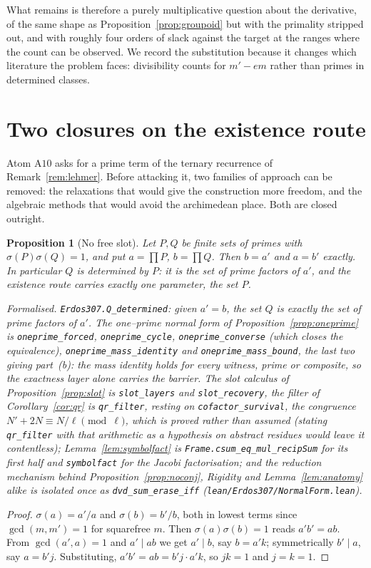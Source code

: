 \documentclass[11pt]{article}
\newtheorem{proposition}[theorem]{Proposition}
\theoremstyle{definition}
\begin{document}
What remains is therefore a purely multiplicative question about the derivative, of the same shape
as Proposition~\ref{prop:groupoid} but with the primality stripped out, and with roughly four orders
of slack against the target at the ranges where the count can be observed. We record the
substitution because it changes which literature the problem faces: divisibility counts for
$m'-em$ rather than primes in determined classes.


\section{Two closures on the existence route}\label{sec:exclosure}

Atom $\mathrm{A}10$ asks for a prime term of the ternary recurrence of
Remark~\textup{\ref{rem:lehmer}}. Before attacking it, two families of approach can be removed:
the relaxations that would give the construction more freedom, and the algebraic methods that
would avoid the archimedean place. Both are closed outright.

\begin{proposition}[No free slot]\label{prop:nofreeslot}
Let $P,Q$ be finite sets of primes with $\sigma(P)\sigma(Q)=1$, and put $a=\prod P$, $b=\prod Q$.
Then $b=a'$ and $a=b'$ exactly. In particular $Q$ is \emph{determined} by $P$: it is the set of
prime factors of $a'$, and the existence route carries exactly one parameter, the set $P$.

\textup{Formalised.} \texttt{Erdos307.Q\_determined}: given $a'=b$, the set $Q$ is exactly the set of
prime factors of $a'$. The one--prime normal form of Proposition~\ref{prop:oneprime} is
\texttt{oneprime\_forced}, \texttt{oneprime\_cycle}, \texttt{oneprime\_converse}
\textup{(}which closes the equivalence\textup{)},
\texttt{oneprime\_mass\_identity} and \texttt{oneprime\_mass\_bound}, the last two giving
part~\textup{(b)}: the mass identity holds for
\emph{every} witness, prime or composite, so the exactness layer alone carries the barrier. The slot
calculus of Proposition~\ref{prop:slot} is \texttt{slot\_layers} and \texttt{slot\_recovery}, the
filter of Corollary~\ref{cor:qr} is \texttt{qr\_filter}, resting on \texttt{cofactor\_survival},
the congruence $N'+2N\equiv N/\ell\pmod\ell$, which is proved rather than assumed (stating \texttt{qr\_filter} with that arithmetic as a hypothesis on abstract residues would leave it contentless); Lemma~\ref{lem:symbolfact} is \texttt{Frame.csum\_eq\_mul\_recipSum} for its first half
and \texttt{symbolfact} for the Jacobi factorisation; and the reduction mechanism behind
Proposition~\ref{prop:noconj}, Rigidity and Lemma~\ref{lem:anatomy} alike is isolated once as
\texttt{dvd\_sum\_erase\_iff} \textup{(\texttt{lean/Erdos307/NormalForm.lean})}.
\end{proposition}
\begin{proof}
$\sigma(a)=a'/a$ and $\sigma(b)=b'/b$, both in lowest terms since $\gcd(m,m')=1$ for squarefree
$m$. Then $\sigma(a)\sigma(b)=1$ reads $a'b'=ab$. From $\gcd(a',a)=1$ and $a'\mid ab$ we get
$a'\mid b$, say $b=a'k$; symmetrically $b'\mid a$, say $a=b'j$. Substituting,
$a'b'=ab=b'j\cdot a'k$, so $jk=1$ and $j=k=1$.
\end{proof}
\end{document}
